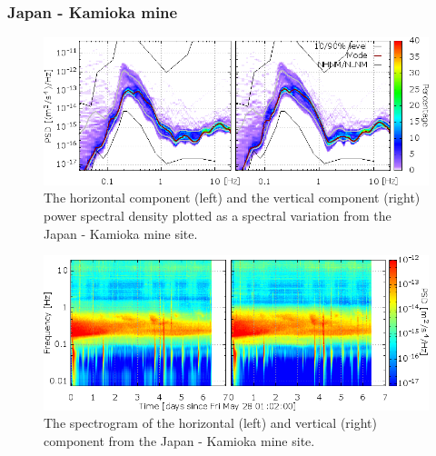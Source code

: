 \subsubsection*{Japan - Kamioka mine}
\begin{figure}[h]
\centering
\includegraphics[width=\textwidth]{./Sec_SiteInfra/Figures/results/Kamioka-A_multiplot1}
\caption{The horizontal component (left) and the vertical component (right) power spectral density plotted as a spectral variation from the Japan - Kamioka mine site.}
\label{fig:Kamioka-A_multiplot1}
\end{figure}\begin{figure}[h]
\centering
\includegraphics[width=\textwidth]{./Sec_SiteInfra/Figures/results/Kamioka-A_multiplot2}
\caption{The spectrogram of the horizontal (left) and vertical (right) component from the Japan - Kamioka mine site.}
\label{fig:Kamioka-A_multiplot2}
\end{figure}

\pagebreak
\FloatBarrier
